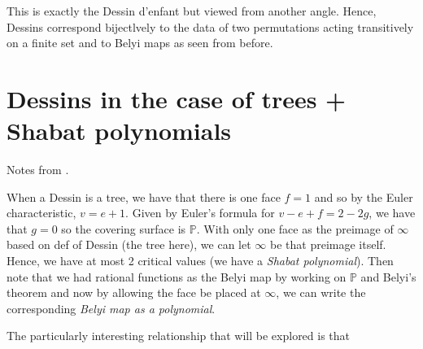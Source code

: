 \documentclass{article}
\theoremstyle{definition}
\newcommand{\PP}{\mathbb{P}}
\begin{document}
This is exactly the Dessin d'enfant but viewed from another angle. Hence, Dessins correspond bijectlvely to the data of two permutations acting transitively on a finite set and to Belyi maps as seen from before.

\section{Dessins in the case of trees + Shabat polynomials}
Notes from \cite{dessin_fuchsian}.

When a Dessin is a tree, we have that there is one face $f=1$ and so by the Euler characteristic, $v=e+1$. Given by Euler's formula for $v-e+f=2-2g$, we have that $g=0$ so the covering surface is $\PP$. With only one face as the preimage of $\infty$ based on def of Dessin (the tree here), we can let $\infty$ be that preimage itself. Hence, we have at most 2 critical values (we have a \emph{Shabat polynomial}). Then note that we had rational functions as the Belyi map by working on $\PP$ and Belyi's theorem and now by allowing the face be placed at $\infty$, we can write the corresponding \emph{Belyi map as a polynomial}.

The particularly interesting relationship that will be explored is that 

\noindent{}



\end{document}
